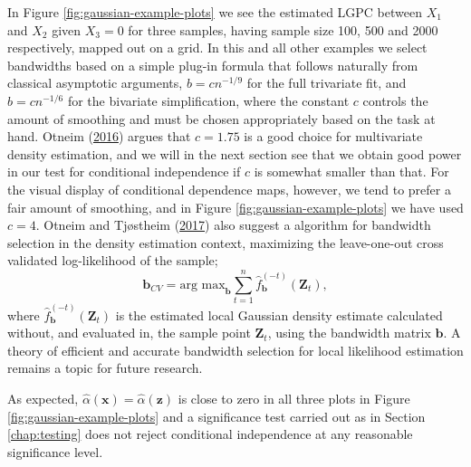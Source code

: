 \documentclass[
  12pt,
  letterpaper]{article}
\newcommand{\x}{\bm{x}}
\newcommand{\Z}{\bm{Z}}
\newcommand{\z}{\bm{z}}
\newcommand{\bb}{\bm{b}}
\theoremstyle{definition}
\theoremstyle{definition}
\theoremstyle{definition}
\theoremstyle{remark}
\begin{document}
In Figure \ref{fig:gaussian-example-plots} we see the estimated LGPC between \(X_1\) and \(X_2\) given \(X_3=0\) for three samples, having sample size 100, 500 and 2000 respectively, mapped out on a grid. In this and all other examples we select bandwidths based on a simple plug-in formula that follows naturally from classical asymptotic arguments, \(b = cn^{-1/9}\) for the full trivariate fit, and \(b = cn^{-1/6}\) for the bivariate simplification, where the constant \(c\) controls the amount of smoothing and must be chosen appropriately based on the task at hand. Otneim (\protect\hyperlink{ref-otneim2016multivariate}{2016}) argues that \(c=1.75\) is a good choice for multivariate density estimation, and we will in the next section see that we obtain good power in our test for conditional independence if \(c\) is somewhat smaller than that. For the visual display of conditional dependence maps, however, we tend to prefer a fair amount of smoothing, and in Figure \ref{fig:gaussian-example-plots} we have used \(c=4\). Otneim and Tjøstheim (\protect\hyperlink{ref-otneim2017locally}{2017}) also suggest a algorithm for bandwidth selection in the density estimation context, maximizing the leave-one-out cross validated log-likelihood of the sample;
\[\bb_{CV} = \textrm{arg max}_{\bb} \sum_{t = 1}^n \widehat{f}_{\bb}^{(-t)}(\Z_t),\]
where \(\widehat f_{\bb}^{(-t)}(\Z_t)\) is the estimated local Gaussian density estimate calculated without, and evaluated in, the sample point \(\Z_t\), using the bandwidth matrix \(\bb\). A theory of efficient and accurate bandwidth selection for local likelihood estimation remains a topic for future research.

As expected, \(\widehat\alpha(\x) = \widehat\alpha(\z)\) is close to zero in all three plots in Figure \ref{fig:gaussian-example-plots} and a significance test carried out as in Section \ref{chap:testing} does not reject conditional independence at any reasonable significance level.
\end{document}
